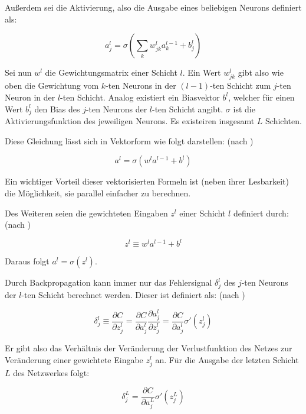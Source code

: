 Außerdem sei die Aktivierung, also die Ausgabe eines beliebigen Neurons definiert als: \cite[Kap.~2]{nielsen_15}

\begin{equation}
a_j^l = \sigma\left(\sum_k w_{jk}^l a_k^{l-1}+b_j^l\right)
\end{equation}

Sei nun $w^l$ die Gewichtungsmatrix einer Schicht $l$. Ein Wert $w_{jk}^l$ gibt also wie oben die Gewichtung vom $k$-ten Neurons in der $\left(l-1\right)$-ten Schicht zum $j$-ten Neuron in der $l$-ten Schicht. Analog existiert ein Biasvektor $b^l$, welcher für einen Wert $b_j^l$ den Bias des $j$-ten Neurons der $l$-ten Schicht angibt. $\sigma$ ist die Aktivierungsfunktion des jeweiligen Neurons. Es existeiren insgesamt $L$ Schichten.

Diese Gleichung lässt sich in Vektorform wie folgt darstellen: (nach \cite[Kap.~2]{nielsen_15})

\begin{equation}
a^l = \sigma\left(w^l a^{l-1}+b^l\right)
\end{equation}

Ein wichtiger Vorteil dieser vektorisierten Formeln ist (neben ihrer Lesbarkeit) die Möglichkeit, sie parallel einfacher zu berechnen.

Des Weiteren seien die gewichteten Eingaben $z^l$ einer Schicht $l$ definiert durch: (nach \cite[Kap.~2]{nielsen_15})

\begin{equation}
z^l \equiv w^l a^{l-1} + b^l
\end{equation}

Daraus folgt $a^l=\sigma\left(z^l\right)$.

Durch Backpropagation kann immer nur das Fehlersignal $\delta_j^l$ des $j$-ten Neurons der $l$-ten Schicht berechnet werden. Dieser ist definiert als: (nach \cite[Kap.~2]{nielsen_15})

\begin{equation}
\delta_j^l \equiv \frac{\partial C}{\partial z_j^l} = \frac{\partial C}{\partial a_j^l}\frac{\partial a_j^l}{\partial z_j^l} = \frac{\partial C}{\partial a_j^l}\sigma'\left(z_j^l\right)
\end{equation}

Er gibt also das Verhältnis der Veränderung der Verlustfunktion des Netzes zur Veränderung einer gewichtete Eingabe $z_j^l$ an. Für die Ausgabe der letzten Schicht $L$ des Netzwerkes folgt:

\begin{equation}
\delta_j^L = \frac{\partial C}{\partial a_j^L}\sigma'\left(z_j^L\right)
\end{equation}

